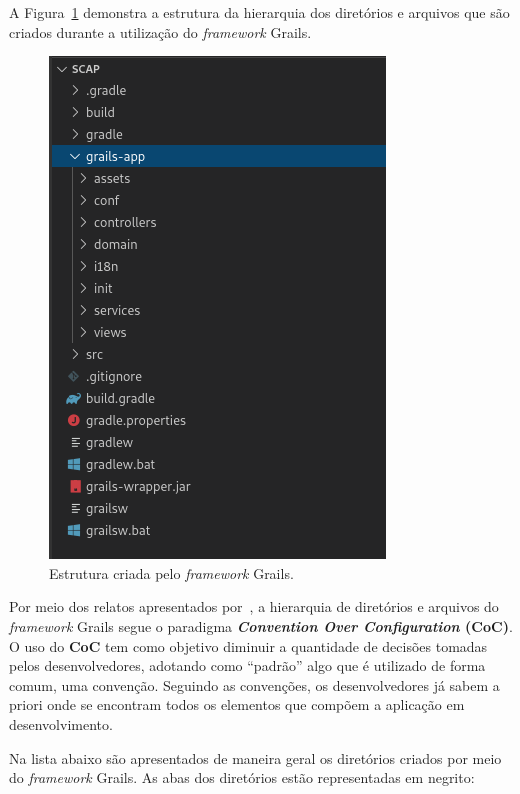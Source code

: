A Figura~\ref{fig-projeto-estrutura-grails} demonstra a estrutura da hierarquia dos diretórios e arquivos que são criados durante a utilização do \textit{framework} Grails.

\begin{figure}[!h]
	\centering
	\includegraphics[scale=0.7]{figuras/fig-projeto-estrutura-grails} 
	\caption{Estrutura criada pelo \textit{framework} Grails.}
	\label{fig-projeto-estrutura-grails}
\end{figure}

Por meio dos relatos apresentados por~, a hierarquia de diretórios e arquivos do \textit{framework} Grails segue o paradigma \textbf{\textit{Convention Over Configuration} (CoC)}. O uso do \textbf{CoC} tem como objetivo diminuir a quantidade de decisões tomadas pelos desenvolvedores, adotando como ``padrão'' algo que é utilizado de forma comum, uma convenção. Seguindo as convenções, os desenvolvedores já sabem a priori onde se encontram todos os elementos que compõem a aplicação em desenvolvimento.

Na lista abaixo são apresentados de maneira geral os diretórios criados por meio do \textit{framework} Grails. As abas dos diretórios estão representadas em negrito:

